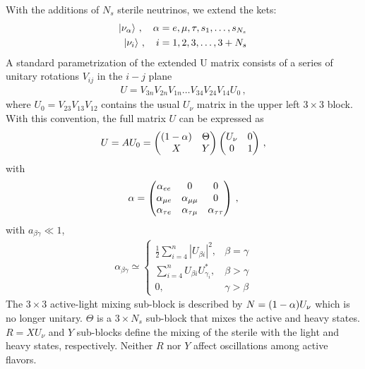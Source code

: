 \documentclass[twocolumn]{article}
\begin{document}
With the additions of $N_s$ sterile neutrinos, we extend the kets:
\begin{align*}
  \ket{\nu_\alpha}\,, \quad \alpha &= e,\mu,\tau,s_1,\ldots ,s_{N_s} \\
  \ket{\nu_i}\,, \quad i &= 1,2,3, \ldots, 3+N_s
\,\end{align*}
A standard parametrization of the extended U matrix consists of a series of unitary rotations $V_{ij}$ in the $i-j$ plane
\begin{align*}
  U = V_{3n}V_{2n}V_{1n} \ldots V_{34}V_{24}V_{14}U_{0}
\,,\end{align*}
where $U_0 = V_{23}V_{13}V_{12}$ contains the usual $U_\nu$ matrix in the upper left $3 \times 3$ block.
With this convention, the full matrix $U$ can be expressed as 
\begin{align*}
  U = AU_0 = \begin{pmatrix} 
              (1-\alpha) & \Theta \\ 
                   X & Y 
            \end{pmatrix}
            \begin{pmatrix} 
              U_\nu & 0 \\
                  0 & 1
            \end{pmatrix} 
\,,\end{align*}
with
\begin{align*}
  \alpha = \begin{pmatrix} 
        \alpha_{ee} & 0 & 0 \\
        \alpha_{\mu e} & \alpha_{\mu \mu} & 0 \\
        \alpha_{\tau e} & \alpha_{\tau \mu} & \alpha_{\tau \tau}
       \end{pmatrix}
\,,\end{align*}
with $a_{\beta \gamma} \ll 1$,
\begin{align}
  \label{abg}
  \alpha_{\beta \gamma} \simeq\left\{
    \begin{array}{ll}
      \frac{1}{2} \sum_{i=4}^{n}\left|U_{\beta i}\right|^{2}, & \beta=\gamma \\
      \sum_{i=4}^{n} U_{\beta i} U_{\gamma_{i}}^{*}, & \beta>\gamma \\
      0, & \gamma>\beta
    \end{array}\right.
\end{align}
The $3 \times 3$ active-light mixing sub-block is described by $N=(1-\alpha)U_\nu$ which is no longer unitary. $\Theta$ is a $3 \times N_s$ sub-block that mixes the active and heavy states. $R = X U_\nu$ and $Y$ sub-blocks define the mixing of the sterile with the light and heavy states, respectively. Neither $R$ nor $Y$ affect oscillations among active flavors.
\end{document}
